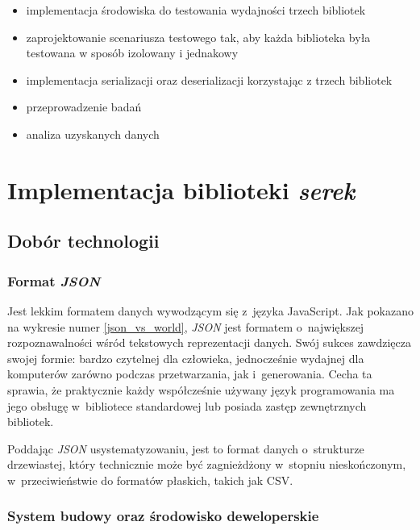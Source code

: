 \documentclass[12pt]{article}
\newcommand{\n}{\newline}
\newcommand{\nonpl}[1]{{\it #1}}
\newcommand{\JSON}{\nonpl{JSON} }
\newcommand{\serek}{\nonpl{serek}}
\begin{document}
{{			\begin{itemize}
				\setlength\itemsep{0mm}
				\item implementacja środowiska do testowania wydajności trzech bibliotek
				\item zaprojektowanie scenariusza testowego tak, aby każda biblioteka była testowana w sposób izolowany i jednakowy
				\item implementacja serializacji oraz deserializacji korzystając z trzech bibliotek
				\item przeprowadzenie badań
				\item analiza uzyskanych danych
			\end{itemize}
		}

	}

	{
		\section{Implementacja biblioteki \serek}\label{serek}

		{
			\subsection{Dobór technologii}

			{
				\subsubsection{Format \JSON}

				Jest lekkim formatem danych wywodzącym się z~języka JavaScript. Jak pokazano na wykresie numer \ref{json_vs_world},
				\JSON jest formatem o~największej rozpoznawalności wśród tekstowych reprezentacji danych. Swój sukces
				zawdzięcza swojej formie: bardzo czytelnej dla człowieka, jednocześnie wydajnej dla komputerów zarówno
				podczas przetwarzania, jak i~generowania. Cecha ta sprawia, że praktycznie każdy współcześnie używany język
				programowania ma jego obsługę\cite{json_short} w~bibliotece standardowej lub posiada zastęp zewnętrznych
				bibliotek.\n

				Poddając \JSON usystematyzowaniu, jest to format danych o~strukturze drzewiastej, który technicznie
				może być zagnieżdżony w~stopniu nieskończonym, w~przeciwieństwie do formatów płaskich, takich jak CSV.\n
			}

			{
				\subsubsection{System budowy oraz środowisko deweloperskie}

}}}
\end{document}
